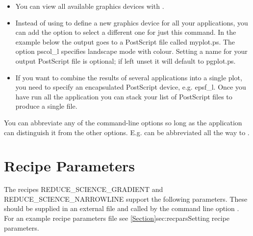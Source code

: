 \documentclass[11pt,oneside,chapters]{starlink}
\begin{document}
\begin{itemize}
\item You can view all available graphics devices with .
\begin{terminalv}
\end{terminalv}

\item Instead of using  to define a new graphics device
for all your applications, you can add the  option to
select a different one for just this command. In the example below the
output goes to a PostScript file called myplot.ps. The option pscol\_l
specifies landscape mode with colour. Setting a name for your output
PostScript file is optional; if left unset it will default to
pgplot.ps.
\begin{terminalv}
\end{terminalv}

\item If you want to combine the results of several applications into
a single plot, you need to specify an encapsulated PostScript device,
e.g. epsf\_l. Once you have run all the application you can stack your
list of PostScript files to produce a single file.
\begin{terminalv}
\end{terminalv}
\end{itemize}

\begin{tip}
You can abbreviate any of the command-line options so long as the
application can distinguish it from the other options. E.g.
 can be abbreviated all the way to
.
\end{tip}


\newpage
\chapter{Recipe Parameters}
\label{app:params}

The recipes REDUCE\_SCIENCE\_GRADIENT and REDUCE\_SCIENCE\_NARROWLINE
support the following parameters. These should be supplied in an
external file and called by the command line option . For an example recipe parameters file see
\cref{Section}{sec:recpars}{Setting recipe parameters}. \\
\end{document}
